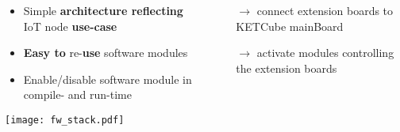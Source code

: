 \begin{frame}%
  \centering
      
    \begin{columns}
      \begin{column}{0.5\paperwidth}
         \centering
         \begin{itemize}
           \item Simple {\bf architecture reflecting} IoT node {\bf use-case}
           \item {\bf Easy to} re-{\bf use} software modules
           \item Enable/disable software module in compile- and run-time
         \end{itemize}
         \vfill
         \texttt{[image: fw\_stack.pdf]}
      \end{column}
      
      \begin{column}{0.4\paperwidth}
           \begin{itemize}
           \item[$\rightarrow$] connect extension boards to KETCube mainBoard
           \item[$\rightarrow$] activate modules controlling the extension boards
         \end{itemize}
       \end{column}
    \end{columns}
  
\end{frame}


\begin{frame}%
    
  
\end{frame}


\begin{frame}%
    
  
\end{frame}



\begin{frame}%
    
  
\end{frame}


  
